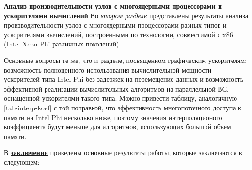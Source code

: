 
\textbf{Анализ производительности узлов с многоядерными процессорами и ускорителями вычислений} 
Во \textit{втором разделе} представлены результаты анализа производительности узлов с многоядерными процессорами разных типов и ускорителями вычислений, построенными по технологии, совместимой с x86 (Intel Xeon Phi различных поколений)

Основные вопросы те же, что и разделе, посвященном графическим ускорителям: возможность полноценного использования вычислительной мощности 
ускорителей типа Intel Phi без задержек на перемещение данных и возможность эффективной реализации вычислительных алгоритмов на параллельной ВС, оснащенной ускорителми такого типа. Можно привести таблицу, аналогичную \ref{tab-interp-koef} с той поправкой, что эффективность многопоточного доступа к памяти на Intel Phi несколько ниже, поэтому значения интерполяционого коэффициента будут меньше для алгоритмов, использующих большой объем памяти.


В \underline{\textbf{заключении}} приведены основные результаты работы, которые заключаются в следующем:



